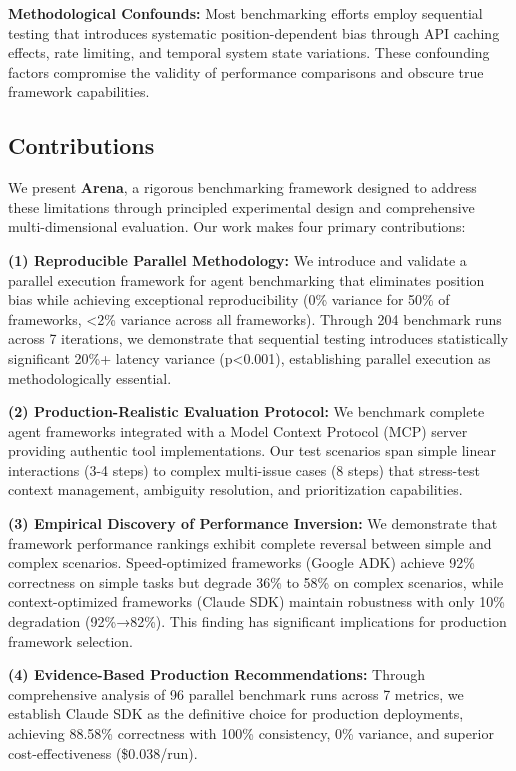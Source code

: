 \documentclass[sigconf,nonacm]{acmart}
\begin{document}
\textbf{Methodological Confounds:} Most benchmarking efforts employ sequential testing that introduces systematic position-dependent bias through API caching effects, rate limiting, and temporal system state variations. These confounding factors compromise the validity of performance comparisons and obscure true framework capabilities.

\subsection{Contributions}

We present \textbf{Arena}, a rigorous benchmarking framework designed to address these limitations through principled experimental design and comprehensive multi-dimensional evaluation. Our work makes four primary contributions:

\textbf{(1) Reproducible Parallel Methodology:} We introduce and validate a parallel execution framework for agent benchmarking that eliminates position bias while achieving exceptional reproducibility (0\% variance for 50\% of frameworks, <2\% variance across all frameworks). Through 204 benchmark runs across 7 iterations, we demonstrate that sequential testing introduces statistically significant 20\%+ latency variance (p<0.001), establishing parallel execution as methodologically essential.

\textbf{(2) Production-Realistic Evaluation Protocol:} We benchmark complete agent frameworks integrated with a Model Context Protocol (MCP) server providing authentic tool implementations. Our test scenarios span simple linear interactions (3-4 steps) to complex multi-issue cases (8 steps) that stress-test context management, ambiguity resolution, and prioritization capabilities.

\textbf{(3) Empirical Discovery of Performance Inversion:} We demonstrate that framework performance rankings exhibit complete reversal between simple and complex scenarios. Speed-optimized frameworks (Google ADK) achieve 92\% correctness on simple tasks but degrade 36\% to 58\% on complex scenarios, while context-optimized frameworks (Claude SDK) maintain robustness with only 10\% degradation (92\%→82\%). This finding has significant implications for production framework selection.

\textbf{(4) Evidence-Based Production Recommendations:} Through comprehensive analysis of 96 parallel benchmark runs across 7 metrics, we establish Claude SDK as the definitive choice for production deployments, achieving 88.58\% correctness with 100\% consistency, 0\% variance, and superior cost-effectiveness (\$0.038/run).
\end{document}
